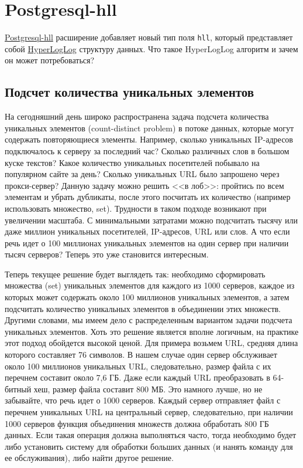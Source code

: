 \section{Postgresql-hll}

\href{https://github.com/aggregateknowledge/postgresql-hll}{Postgresql-hll} расширение добавляет новый тип поля \lstinline!hll!, который представляет собой \href{https://en.wikipedia.org/wiki/HyperLogLog}{HyperLogLog} структуру данных. Что такое HyperLogLog алгоритм и зачем он может потребоваться?


\subsection{Подсчет количества уникальных элементов}

На сегодняшний день широко распространена задача подсчета количества уникальных элементов (count-distinct problem) в потоке данных, которые могут содержать повторяющиеся элементы. Например, сколько уникальных IP-адресов подключалось к серверу за последний час? Сколько различных слов в большом куске текстов? Какое количество уникальных посетителей побывало на популярном сайте за день? Сколько уникальных URL было запрошено через прокси-сервер? Данную задачу можно решить <<в лоб>>: пройтись по всем элементам и убрать дубликаты, после этого посчитать их количество (например использовать множество, set). Трудности в таком подходе возникают при увеличении масштаба. С минимальными затратами можно подсчитать тысячу или даже миллион уникальных посетителей, IP-адресов, URL или слов. А что если речь идет о 100 миллионах уникальных элементов на один сервер при наличии тысяч серверов? Теперь это уже становится интересным.

Теперь текущее решение будет выглядеть так: необходимо сформировать множества (set) уникальных элементов для каждого из 1000 серверов, каждое из которых может содержать около 100 миллионов уникальных элементов, а затем подсчитать количество уникальных элементов в объединении этих множеств. Другими словами, мы имеем дело с распределенным вариантом задачи подсчета уникальных элементов. Хоть это решение является вполне логичным, на практике этот подход обойдется высокой ценой. Для примера возьмем URL, средняя длина которого составляет 76 символов. В нашем случае один сервер обслуживает около 100 миллионов уникальных URL, следовательно, размер файла с их перечнем составит около 7,6 ГБ. Даже если каждый URL преобразовать в 64-битный хеш, размер файла составит 800 МБ. Это намного лучше, но не забывайте, что речь идет о 1000 серверов. Каждый сервер отправляет файл с перечнем уникальных URL на центральный сервер, следовательно, при наличии 1000 серверов функция объединения множеств должна обработать 800 ГБ данных. Если такая операция должна выполняться часто, тогда необходимо будет либо установить систему для обработки больших данных (и нанять команду для ее обслуживания), либо найти другое решение.

